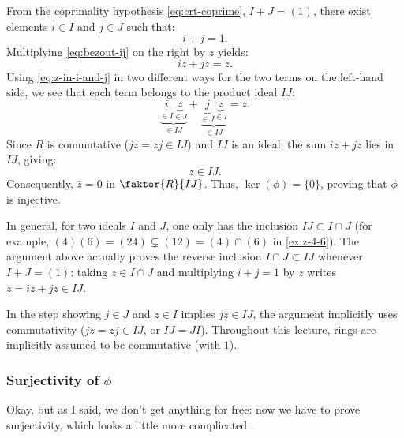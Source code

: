 \begin{proofWrapper}
\begin{content}
From the coprimality hypothesis \eqref{eq:crt-coprime}, $I + J = (1)$, there exist elements $i \in I$ and $j \in J$ such that:
\begin{equation}\label{eq:bezout-ij}
i + j = 1.
\end{equation}
Multiplying \eqref{eq:bezout-ij} on the right by $z$ yields:
\[
iz + jz = z.
\]
Using \eqref{eq:z-in-i-and-j} in two different ways for the two terms on the left-hand side, we see that each term belongs to the product ideal $IJ$:
\[
\underbrace{\underbrace{i}_{\in I} \underbrace{z}_{\in J}}_{\in IJ} + \underbrace{\underbrace{j}_{\in J} \underbrace{z}_{\in I}}_{\in IJ} = z.
\]
Since $R$ is commutative ($jz = zj \in IJ$) and $IJ$ is an ideal, the sum $iz + jz$ lies in $IJ$, giving:
\[
z \in IJ.
\]
Consequently, $\bar{z} = 0$ in $\faktor{R}{IJ}$. Thus, $\ker(\phi) = \{\bar{0}\}$, proving that $\phi$ is injective.

\begin{steps}[Why \texorpdfstring{$I \cap J = IJ$}{I intersect J = IJ} Under Coprimality]
In general, for two ideals $I$ and $J$, one only has the inclusion $IJ \subset I \cap J$ (for example, $(4)(6) = (24) \subsetneq (12) = (4) \cap (6)$ in \cref{ex:z-4-6}). The argument above actually proves the reverse inclusion $I \cap J \subset IJ$ whenever $I + J = (1)$: taking $z \in I \cap J$ and multiplying $i + j = 1$ by $z$ writes $z = iz + jz \in IJ$.
\end{steps}
\end{content}

\begin{aiNote}
In the step showing $j \in J$ and $z \in I$ implies $jz \in IJ$, the argument implicitly uses commutativity ($jz = zj \in IJ$, or $IJ = JI$). Throughout this lecture, rings are implicitly assumed to be commutative (with $1$).
\end{aiNote}

\subsubsection{Surjectivity of \texorpdfstring{$\phi$}{phi}}

\begin{speech}[00:09:25 - 00:10:38]
Okay, but as I said, we don't get anything for free: now we have to prove surjectivity, which looks a little more complicated .


\end{speech}
\end{proofWrapper}

